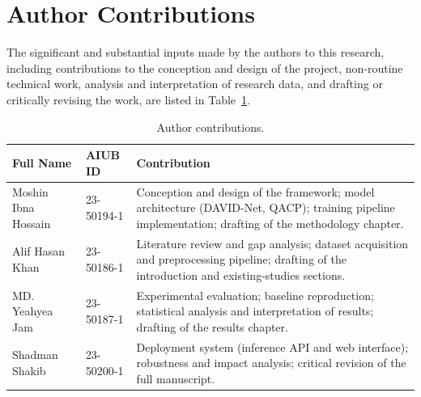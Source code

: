 \chapter*{Author Contributions}

The significant and substantial inputs made by the authors to this research,
including contributions to the conception and design of the project,
non-routine technical work, analysis and interpretation of research data, and
drafting or critically revising the work, are listed in
Table~\ref{tab:contributions}. 

\begin{table}[h]
\centering
\caption{Author contributions.}
\label{tab:contributions}
\small
\begin{tabular}{p{3.6cm} p{2.2cm} p{7.6cm}}
\toprule
\textbf{Full Name} & \textbf{AIUB ID} & \textbf{Contribution} \\
\midrule
Moshin Ibna Hossain & 23-50194-1 &
Conception and design of the framework; model architecture (DAVID-Net, QACP);
training pipeline implementation; drafting of the methodology chapter. \\
\addlinespace
Alif Hasan Khan & 23-50186-1 &
Literature review and gap analysis; dataset acquisition and preprocessing
pipeline; drafting of the introduction and existing-studies sections. \\
\addlinespace
MD. Yeahyea Jam & 23-50187-1 &
Experimental evaluation; baseline reproduction; statistical analysis and
interpretation of results; drafting of the results chapter. \\
\addlinespace
Shadman Shakib & 23-50200-1 &
Deployment system (inference API and web interface); robustness and impact
analysis; critical revision of the full manuscript. \\
\bottomrule
\end{tabular}
\end{table}

\clearpage
